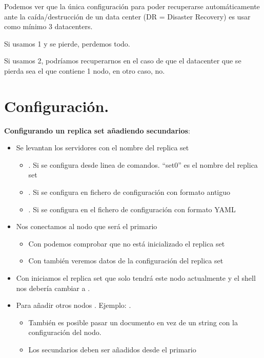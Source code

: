 \documentclass[a4paper,10pt,english]{sphinxmanual}
\begin{document}
Podemos ver que la única configuración para poder recuperarse automáticamente ante la caída/destrucción de un data center (DR = Disaster Recovery) es usar como mínimo 3 datacenters.

Si usamos 1 y se pierde, perdemos todo.

Si usamos 2, podríamos recuperarnos en el caso de que el datacenter que se pierda sea el que contiene 1 nodo, en otro caso, no.


\section{Configuración.}
\label{contents/replicaSet:configuracion}
\textbf{Configurando un replica set añadiendo secundarios}:
\begin{itemize}
\item {} 
Se levantan los servidores con el nombre del replica set
\begin{itemize}
\item {} 
. Si se configura desde linea de comandos. ``set0'' es el nombre del replica set

\item {} 
. Si se configura en fichero de configuración con formato antiguo

\item {} 
. Si se configura en el fichero de configuración con formato YAML

\end{itemize}

\item {} 
Nos conectamos al nodo que será el primario
\begin{itemize}
\item {} 
Con  podemos comprobar que no está inicializado el replica set

\item {} 
Con  también veremos datos de la configuración del replica set

\end{itemize}

\item {} 
Con  iniciamos el replica set que solo tendrá este nodo actualmente
y el shell nos debería cambiar a .

\item {} 
Para añadir otros nodos . Ejemplo: .
\begin{itemize}
\item {} 
También es posible pasar un documento en vez de un string con la configuración del nodo.

\item {} 
Los secundarios deben ser añadidos desde el primario

\end{itemize}

\end{itemize}
\end{document}
